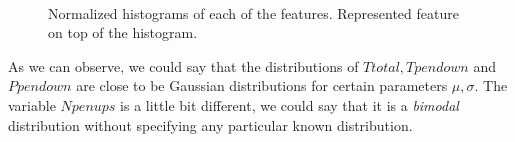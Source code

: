 \documentclass[a4paper]{article}
\begin{document}
{\begin{figure}[H]
  \centering
  \qquad
  \\
  \qquad%
  \caption{Normalized histograms of each of the features. Represented feature on top of the histogram.}
  \label{fig:four:signals:2}
\end{figure}


As we can observe, we could say that the distributions of \(Ttotal, Tpendown\) and \(Ppendown\) are close to be Gaussian distributions for certain parameters \(\mu,\sigma\). The variable \(Npenups\) is a little bit different, we could say that it is a \emph{bimodal} distribution without specifying any particular known distribution.

}
\end{document}

